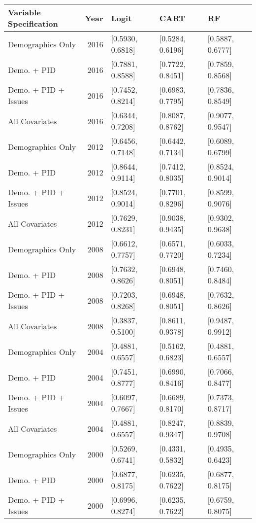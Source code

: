 \begin{longtable}{lrlll}
  \toprule
Variable Specification & Year & Logit & CART & RF \\ 
  \midrule
Demographics Only & 2016 & [0.5930, 0.6818] & [0.5284, 0.6196] & [0.5887, 0.6777] \\ 
  Demo. + PID & 2016 & [0.7881, 0.8588] & [0.7722, 0.8451] & [0.7859, 0.8568] \\ 
  Demo. + PID + Issues & 2016 & [0.7452, 0.8214] & [0.6983, 0.7795] & [0.7836, 0.8549] \\ 
  All Covariates & 2016 & [0.6344, 0.7208] & [0.8087, 0.8762] & [0.9077, 0.9547] \\ 
  Demographics Only & 2012 & [0.6456, 0.7148] & [0.6442, 0.7134] & [0.6089, 0.6799] \\ 
  Demo. + PID & 2012 & [0.8644, 0.9114] & [0.7412, 0.8035] & [0.8524, 0.9014] \\ 
  Demo. + PID + Issues & 2012 & [0.8524, 0.9014] & [0.7701, 0.8296] & [0.8599, 0.9076] \\ 
  All Covariates & 2012 & [0.7629, 0.8231] & [0.9038, 0.9435] & [0.9302, 0.9638] \\ 
  Demographics Only & 2008 & [0.6612, 0.7757] & [0.6571, 0.7720] & [0.6033, 0.7234] \\ 
  Demo. + PID & 2008 & [0.7632, 0.8626] & [0.6948, 0.8051] & [0.7460, 0.8484] \\ 
  Demo. + PID + Issues & 2008 & [0.7203, 0.8268] & [0.6948, 0.8051] & [0.7632, 0.8626] \\ 
  All Covariates & 2008 & [0.3837, 0.5100] & [0.8611, 0.9378] & [0.9487, 0.9912] \\ 
  Demographics Only & 2004 & [0.4881, 0.6557] & [0.5162, 0.6823] & [0.4881, 0.6557] \\ 
  Demo. + PID & 2004 & [0.7451, 0.8777] & [0.6990, 0.8416] & [0.7066, 0.8477] \\ 
  Demo. + PID + Issues & 2004 & [0.6097, 0.7667] & [0.6689, 0.8170] & [0.7373, 0.8717] \\ 
  All Covariates & 2004 & [0.4881, 0.6557] & [0.8247, 0.9347] & [0.8839, 0.9708] \\ 
  Demographics Only & 2000 & [0.5269, 0.6741] & [0.4331, 0.5832] & [0.4935, 0.6423] \\ 
  Demo. + PID & 2000 & [0.6877, 0.8175] & [0.6235, 0.7622] & [0.6877, 0.8175] \\ 
  Demo. + PID + Issues & 2000 & [0.6996, 0.8274] & [0.6235, 0.7622] & [0.6759, 0.8075] \\ 

\end{longtable}
